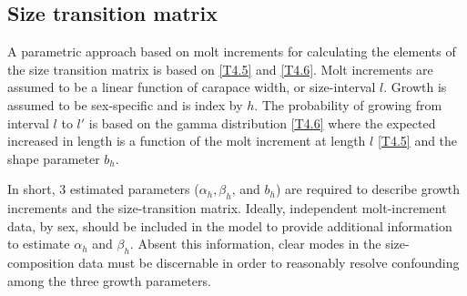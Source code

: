\subsection{Size transition matrix} %
\label{sub:size_transition_matrix}

A parametric approach based on molt increments for calculating the elements of the size transition matrix is based on \eqref{T4.5} and \eqref{T4.6}.  Molt increments are assumed to be a linear function of carapace width, or size-interval $l$. Growth is assumed to be sex-specific and is index by $h$.  The probability of growing from interval $l$ to $l'$ is based on the gamma distribution \eqref{T4.6} where the expected increased in length is a function of the molt increment at length $l$ \eqref{T4.5} and the shape parameter $b_h$.

In short, 3 estimated parameters ($\alpha_h, \beta_h$, and $b_h$) are required to describe growth increments and the size-transition matrix.  Ideally, independent molt-increment data, by sex, should be included in the model to provide additional information to estimate $\alpha_h$ and $\beta_h$.  Absent this information, clear modes in the size-composition data must be discernable in order to reasonably resolve confounding among the three growth parameters.


